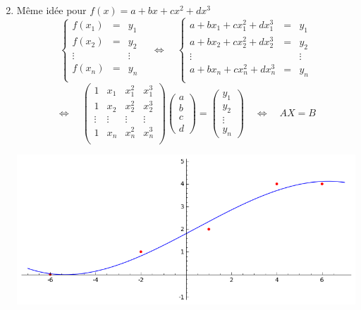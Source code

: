 \begin{frame}
\begin{enumerate}
  \setcounter{enumi}{1}
  \item Même idée pour $f(x) = a + bx +c x^2 + dx^3$
   $$
  \left\{ 
  \begin{array}{rcl}
  f(x_1) &=& y_1 \\
  f(x_2) &=& y_2 \\
  \vdots && \vdots\\
  f(x_n) &=& y_n \\
  \end{array}
  \right.
  \quad
  \iff
  \quad
  \left\{ 
  \begin{array}{rcl}
  a +b x_1 + c x_1^2 + d x_1^3 &=& y_1 \\
  a +b x_2 + c x_2^2 + d x_2^3 &=& y_2 \\
  \vdots && \vdots\\
  a +b x_n + c x_n^2 + d x_n^3 &=& y_n \\
  \end{array}
  \right.
  $$
  $$
  \iff
  \quad 
  \begin{pmatrix}
  1 & x_1 & x_1^2 & x_1^3\\
  1 & x_2 & x_2^2 & x_2^3 \\
  \vdots & \vdots & \vdots & \vdots\\
  1 & x_n & x_n^2 & x_n^3  \\  
  \end{pmatrix}
  \begin{pmatrix}
  a \\ b \\ c \\ d
  \end{pmatrix}
  = 
  \begin{pmatrix}
  y_1\\
  y_2 \\
  \vdots \\
  y_n
  \end{pmatrix}
  \quad
  \iff
  \quad 
  AX = B
  $$ 
  
\begin{center}  
    \includegraphics[scale=0.35]{figures/moindres_carres2}
\end{center}    
\end{enumerate}
\end{frame}



